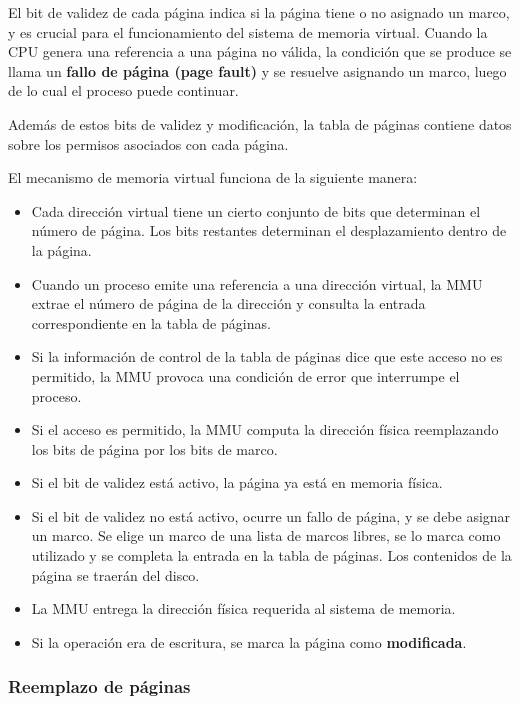 \documentclass[spanish,A4,]{article}
\begin{document}
El bit de validez de cada página indica si la página tiene o no asignado
un marco, y es crucial para el funcionamiento del sistema de memoria
virtual. Cuando la CPU genera una referencia a una página no válida, la
condición que se produce se llama un \textbf{fallo de página (page
fault)} y se resuelve asignando un marco, luego de lo cual el proceso
puede continuar.

Además de estos bits de validez y modificación, la tabla de páginas
contiene datos sobre los permisos asociados con cada página.

El mecanismo de memoria virtual funciona de la siguiente manera:

\begin{itemize}
\itemsep1pt\parskip0pt
\item
  Cada dirección virtual tiene un cierto conjunto de bits que determinan
  el número de página. Los bits restantes determinan el desplazamiento
  dentro de la página.
\item
  Cuando un proceso emite una referencia a una dirección virtual, la MMU
  extrae el número de página de la dirección y consulta la entrada
  correspondiente en la tabla de páginas.
\item
  Si la información de control de la tabla de páginas dice que este
  acceso no es permitido, la MMU provoca una condición de error que
  interrumpe el proceso.
\item
  Si el acceso es permitido, la MMU computa la dirección física
  reemplazando los bits de página por los bits de marco.
\item
  Si el bit de validez está activo, la página ya está en memoria física.
\item
  Si el bit de validez no está activo, ocurre un fallo de página, y se
  debe asignar un marco. Se elige un marco de una lista de marcos
  libres, se lo marca como utilizado y se completa la entrada en la
  tabla de páginas. Los contenidos de la página se traerán del disco.
\item
  La MMU entrega la dirección física requerida al sistema de memoria.
\item
  Si la operación era de escritura, se marca la página como
  \textbf{modificada}.
\end{itemize}

\subsubsection{Reemplazo de páginas}\label{reemplazo-de-puxe1ginas}
\end{document}
